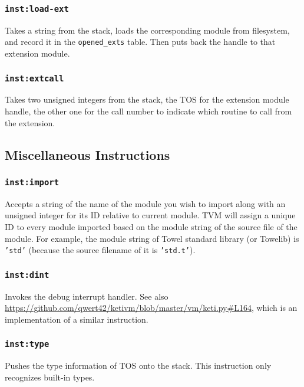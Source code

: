 \documentclass{article}
\newcommand{\inst}[1] {\texttt{inst:#1}}
\begin{document}
\subsubsection{\inst{load-ext}}

Takes a string from the stack, loads the corresponding module from filesystem, and record it in the \texttt{opened\_exts} table. Then puts back the handle to that extension module.

\subsubsection{\inst{extcall}}

Takes two unsigned integers from the stack, the TOS for the extension module handle, the other one for the call number to indicate which routine to call from the extension.

\subsection{Miscellaneous Instructions}

\subsubsection{\inst{import}}

Accepts a string of the name of the module you wish to import along with an unsigned integer for its ID relative to current module. TVM will assign a unique ID to every module imported based on the module string of the source file of the module. For example, the module string of Towel standard library (or Towelib) is \texttt{'std'} (because the source filename of it is \texttt{'std.t'}).

\subsubsection{\inst{dint}}

Invokes the debug interrupt handler. See also \url{https://github.com/qwert42/ketivm/blob/master/vm/keti.py#L164}, which is an implementation of a similar instruction.

\subsubsection{\inst{type}}

Pushes the type information of TOS onto the stack. This instruction only recognizes built-in types.
\end{document}
